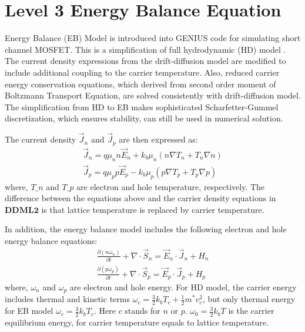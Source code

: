 \section{Level 3 Energy Balance Equation}\label{sec:Equation:EBML3} 
Energy Balance (EB) Model \cite{PISCES-2ET} is introduced into GENIUS code for simulating short channel MOSFET. This is a simplification of full hydrodynamic (HD) model \cite{Aste2003}. The current density expressions from the drift-diffusion model are modified to include additional coupling to the carrier temperature. Also, reduced carrier energy conservation equations, which derived from second order moment of Boltzmann Transport Equation, are solved consistently with drift-diffusion model. The simplification from HD to EB makes sophisticated Scharfetter-Gummel discretization, which ensures stability, can still be used in numerical solution.

The current density $\vec{J}_n$ and $\vec{J}_p$ are then expressed as:
\begin{equation}\begin{array}{l}
 \vec{J}_n  = q\mu_n n \vec{E}_n + k_b \mu_n \left( {n\nabla T_n + T_n \nabla n} \right)  \\
 \vec{J}_p  = q\mu_p p \vec{E}_p - k_b \mu_p \left( {p\nabla T_p + T_p \nabla p} \right)
\end{array}\end{equation}
where, $T\_n$ and $T\_p$ are electron and hole temperature, respectively. The difference between the equations above and the carrier density equations in $\mathbf{DDML2}$ is that lattice temperature is replaced by carrier temperature.

In addition, the energy balance model includes the following electron and hole energy balance equations:
\begin{equation}\begin{array}{l}
\displaystyle \frac{\partial \left( {n\omega _n } \right)} {\partial t} + \nabla \cdot \vec{S}_n  = \vec{E}_n \cdot \vec{J}_n +H_n \\
\displaystyle \frac{\partial \left( {p\omega _p } \right)} {\partial t} + \nabla \cdot \vec{S}_p = \vec{E}_p \cdot \vec{J}_p +H_p
\end{array}\end{equation}
where, $\omega _n$ and $\omega _p$ are electron and hole energy. For HD model, the carrier energy includes thermal and kinetic terms $\omega _c =\frac{3}{2}k_bT_c + \frac{1}{2}m^* v_c^2$, but only thermal energy for EB model $\omega _c = \frac{3}{2}k_bT_c$. Here $c$ stands for $n$ or $p$. $\omega_0=\frac{3}{2}k_bT$ is the carrier equilibrium energy, for carrier temperature equals to lattice temperature.

